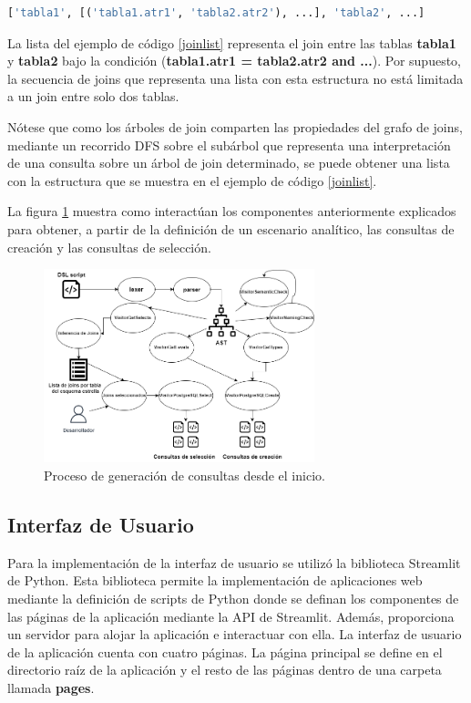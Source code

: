 \begin{lstlisting}[label={joinlist}, caption={Estructura de una lista que representa una secuencia de joins}, language=python]
    ['tabla1', [('tabla1.atr1', 'tabla2.atr2'), ...], 'tabla2', ...]
\end{lstlisting}

La lista del ejemplo de c\'odigo \ref{joinlist} representa el join entre las tablas \textbf{tabla1} y \textbf{tabla2} 
bajo la condición (\textbf{tabla1.atr1 = tabla2.atr2 and ...}). Por supuesto, la secuencia de joins 
que representa una lista con esta estructura no est\'a limitada a un join entre solo dos tablas.

N\'otese que como los \'arboles de join comparten las propiedades del grafo de joins, mediante un recorrido 
DFS sobre el subárbol que representa una interpretaci\'on de una consulta sobre un \'arbol de join determinado, se puede 
obtener una lista con la estructura que se muestra en el ejemplo de c\'odigo \ref{joinlist}. 

La figura \ref{fig:allpro} muestra como interactúan los componentes anteriormente explicados 
para obtener, a partir de la definición de un escenario anal\'itico, las consultas de creación y las consultas de  
selección.

\begin{figure}[H]
    \centering
    \includegraphics[width=0.7\textwidth]{Graphics/all_procces.drawio.png}
    \caption{Proceso de generación de consultas desde el inicio.}
    \label{fig:allpro}
\end{figure}

\subsection{Interfaz de Usuario}

Para la implementación de la interfaz de usuario se utilizó la biblioteca Streamlit de Python. Esta biblioteca 
permite la implementación de aplicaciones web mediante la definición de scripts de Python donde se 
definan los componentes de las páginas de la aplicación mediante la API de Streamlit. Además, proporciona un 
servidor para alojar la aplicación e interactuar con ella. La interfaz de usuario de la aplicación cuenta 
con cuatro páginas. La página principal se define en el directorio raíz de la aplicación y el resto de las 
páginas dentro de una carpeta llamada \textbf{pages}. 

